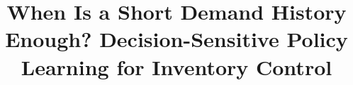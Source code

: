 \documentclass[preprint,12pt,authoryear]{elsarticle}
\begin{document}
\begin{frontmatter}
\title{When Is a Short Demand History Enough? Decision-Sensitive Policy Learning for Inventory Control}
\end{frontmatter}

% 
% 
% 
% 
% 
% 
% 


\end{document}
